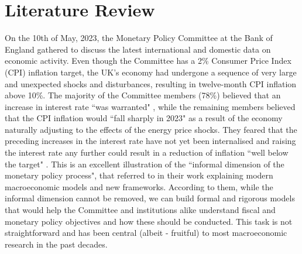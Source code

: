 \section{Literature Review}

On the 10th of May, 2023, the Monetary Policy Committee at the Bank of England gathered to discuss the latest international and domestic data on economic activity. Even though the Committee has a 2\% Consumer Price Index (CPI) inflation target, the UK's economy had undergone a sequence of very large and unexpected shocks and disturbances, resulting in twelve-month CPI inflation above 10\%. The majority of the Committee members (78\%) believed that an increase in interest rate ``was warranted" \parencite[4]{boe_2023_monetary}, while the remaining members believed that the CPI inflation would ``fall sharply in 2023" \parencite[5]{boe_2023_monetary} as a result of the economy naturally adjusting to the effects of the energy price shocks. They feared that the preceding increases in the interest rate have not yet been internalised and raising the interest rate any further could result in a reduction of inflation ``well below the target" \parencite[5]{boe_2023_monetary}. This is an excellent illustration of the ``informal dimension of the monetary policy process", that \parencite[26]{gals_2007_macroeconomic} referred to in their work explaining modern macroeconomic models and new frameworks. According to them, while the informal dimension cannot be removed, we can build formal and rigorous models that would help the Committee and institutions alike understand fiscal and monetary policy objectives and how these should be conducted. This task is not straightforward and has been central (albeit - fruitful) to most macroeconomic research in the past decades. 

